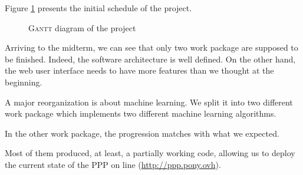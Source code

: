 Figure \ref{overview:gantt} presents the initial schedule of the project.

\begin{figure}[!ht]
\centering
\label{overview:gantt}
\caption{\textsc{Gantt} diagram of the project}
\end{figure}

Arriving to the midterm, we can see that only two work package are supposed to be finished. Indeed, the software architecture is well defined. On the other hand, the web user interface needs to have more features than we thought at the beginning.

A major reorganization is about machine learning. We split it into two different work package which implements two different machine learning algorithms.

In the other work package, the progression matches with what we expected.

Most of them produced, at least, a partially working code, allowing us to deploy the current state of the PPP on line (\url{http://ppp.pony.ovh}).
